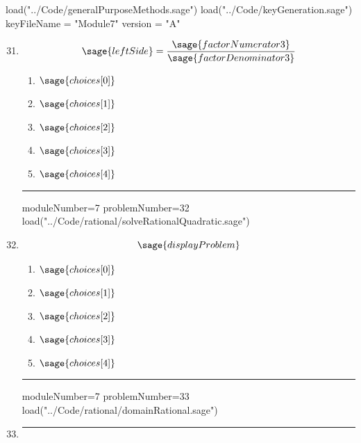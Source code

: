 \documentclass[14pt]{article}
\newcommand{\litem}[1]{\item#1\hspace*{-1cm}\rule{\textwidth}{0.4pt}}
\begin{document}
\pagestyle{fancy}

\begin{sagesilent}
load("../Code/generalPurposeMethods.sage")
load("../Code/keyGeneration.sage")
keyFileName = "Module7"
version = "A"
\end{sagesilent}

\begin{enumerate}
\setcounter{enumi}{30}


\begin{sagesilent}
moduleNumber=7
problemNumber=31
load("../Code/rational/solveRationalLinear.sage")
\end{sagesilent}

\litem{ 

	\[ \sage{leftSide} = \frac{\sage{factorNumerator3}}{\sage{factorDenominator3}}  \]

	\begin{enumerate}[label=\Alph*.]
    \item \( \sage{choices[0]} \)
    \item \( \sage{choices[1]} \)
    \item \( \sage{choices[2]} \)
    \item \( \sage{choices[3]} \)
    \item \( \sage{choices[4]} \)
	\end{enumerate}
}

\begin{sagesilent}
moduleNumber=7
problemNumber=32
load("../Code/rational/solveRationalQuadratic.sage")
\end{sagesilent}

\litem{ 

	\[ \sage{displayProblem} \]

	\begin{enumerate}[label=\Alph*.]
    \item \( \sage{choices[0]} \)
    \item \( \sage{choices[1]} \)
    \item \( \sage{choices[2]} \)
    \item \( \sage{choices[3]} \)
    \item \( \sage{choices[4]} \)
	\end{enumerate}
}

\begin{sagesilent}
moduleNumber=7
problemNumber=33
load("../Code/rational/domainRational.sage")
\end{sagesilent}

\litem{ 

}
\end{enumerate}
\end{document}
